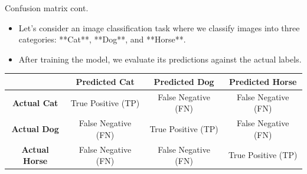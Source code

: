 \documentclass[serif, aspectratio=169]{beamer}
\begin{document}
\begin{frame}{Confusion matrix cont.}
    \begin{itemize}
        \item Let's consider an image classification task where we classify images into three categories: **Cat**, **Dog**, and **Horse**.
        \item After training the model, we evaluate its predictions against the actual labels.
    \end{itemize}
    
    \vfill
    \centering
    \begin{tabular}{|c|c|c|c|}
    \hline
    & \textbf{Predicted Cat} & \textbf{Predicted Dog} & \textbf{Predicted Horse} \\
    \hline
    \textbf{Actual Cat} & True Positive (TP) & False Negative (FN) & False Negative (FN) \\
    \hline
    \textbf{Actual Dog} & False Negative (FN) & True Positive (TP) & False Negative (FN) \\
    \hline
    \textbf{Actual Horse} & False Negative (FN) & False Negative (FN) & True Positive (TP) \\
    \hline
    \end{tabular}
\end{frame}
\end{document}
